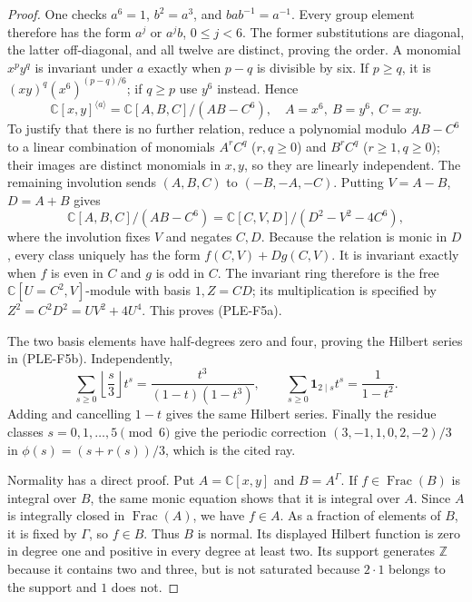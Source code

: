 \documentclass[11pt,a4paper]{article}
\begin{document}
\begin{proof}
One checks $a^6=1$, $b^2=a^3$, and $bab^{-1}=a^{-1}$.
Every group element therefore has the form $a^j$ or $a^jb$, $0\leq j<6$.
The former substitutions are diagonal, the latter off-diagonal, and all
twelve are distinct, proving the order.
A monomial $x^py^q$ is invariant under $a$ exactly when $p-q$ is divisible
by six. If $p\geq q$, it is $(xy)^q(x^6)^{(p-q)/6}$; if $q\geq p$ use
$y^6$ instead. Hence
\[
 \mathbb C[x,y]^{\langle a\rangle}
   =\mathbb C[A,B,C]/(AB-C^6),
 \quad A=x^6,\ B=y^6,\ C=xy.
\]
To justify that there is no further relation, reduce a polynomial modulo
$AB-C^6$ to a linear combination of monomials $A^rC^q$ ($r,q\geq0$)
and $B^rC^q$ ($r\geq1,q\geq0$); their images are distinct monomials in
$x,y$, so they are linearly independent.
The remaining involution sends $(A,B,C)$ to $(-B,-A,-C)$.
Putting $V=A-B$, $D=A+B$ gives
\[
 \mathbb C[A,B,C]/(AB-C^6)
   =\mathbb C[C,V,D]/(D^2-V^2-4C^6),
\]
where the involution fixes $V$ and negates $C,D$.
Because the relation is monic in $D$, every class uniquely has the form
$f(C,V)+Dg(C,V)$. It is invariant exactly when $f$ is even in $C$ and
$g$ is odd in $C$. The invariant ring therefore is the free
$\mathbb C[U=C^2,V]$-module with basis $1,Z=CD$; its multiplication is
specified by
$Z^2=C^2D^2=UV^2+4U^4$. This proves (PLE-F5a).

The two basis elements have half-degrees zero and four, proving the
Hilbert series in (PLE-F5b). Independently,
\[
 \sum_{s\geq0}\left\lfloor\frac{s}{3}\right\rfloor t^s
       =\frac{t^3}{(1-t)(1-t^3)},\qquad
 \sum_{s\geq0}\mathbf1_{2\mid s}t^s=\frac1{1-t^2}.
\]
Adding and cancelling $1-t$ gives the same Hilbert series. Finally the
residue classes $s=0,1,\ldots,5\pmod6$ give the periodic correction
$(3,-1,1,0,2,-2)/3$ in $\phi(s)=(s+r(s))/3$, which is the cited ray.

Normality has a direct proof. Put $A=\mathbb C[x,y]$ and $B=A^\Gamma$.
If $f\in\operatorname{Frac}(B)$ is integral over $B$, the same monic
equation shows that it is integral over $A$. Since $A$ is integrally
closed in $\operatorname{Frac}(A)$, we have $f\in A$. As a fraction of
elements of $B$, it is fixed by $\Gamma$, so $f\in B$. Thus $B$ is
normal. Its displayed Hilbert function is zero in degree one and positive
in every degree at least two. Its support generates $\mathbb Z$ because
it contains two and three, but is not saturated because $2\cdot1$ belongs
to the support and $1$ does not.
\end{proof}
\end{document}
